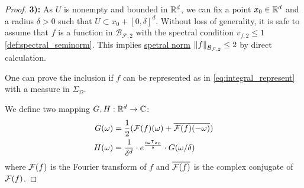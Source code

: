 \begin{proof}





\textbf{3):} As $U$ is nonempty and bounded in $\mathbb{R}^d$, we can fix a point $x_0
\in \mathbb{R}^d$ and a radius $\delta > 0$ such that $U \subset x_0 + [0,\delta]^d$.
Without loss of generality, it is safe to assume that $f$ is a function in
$\mathcal{B}_{\mathcal{F},2}$ with the spectral condition $v_{f,2}\leq 1$
\eqref{def:spectral_seminorm}. This implies \hyperref[def:spectral_norm]{spetral
norm} $\left\| f \right\|_{\mathcal{B}_{\mathcal{F}, 2}} \leq 2$ by direct calculation. 

One can prove the inclusion if $f$ can be represented as in
\eqref{eq:integral_represent} with a measure in $\Sigma_{\Omega}$.

We define two mapping $G, H: \mathbb{R}^d \to \mathbb{C}$:
\begin{align*}
    G(\omega) &= \frac{1}{2} (\mathcal{F}(f)(\omega) 
                    + \overline{\mathcal{F}(f)(-\omega)}) \\
    H(\omega) &= \frac{1}{\delta^d} \cdot 
                    e^{\frac{i \omega{}^{\intercal} x_0}{\delta}} \cdot 
                    G(\omega / \delta)
\end{align*}
where $\mathcal{F}(f)$ is the Fourier transform of $f$ and $\overline{\mathcal{F}(f)}$
is the complex conjugate of $\mathcal{F}(f)$.


\end{proof}
